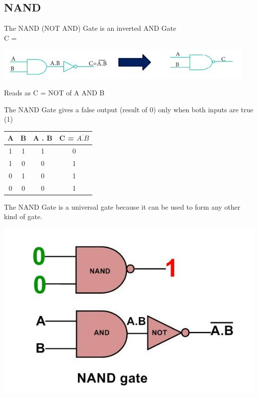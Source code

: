 \documentclass{article}
\begin{document}
\subsection{NAND}
The NAND (NOT AND) Gate is an inverted AND Gate \\
C = \begin{center}
	\includegraphics{16}
\end{center}
\color{red}Reads as C = NOT of A AND B \\ \color{black}

The NAND Gate gives a false output (result of 0) only when both inputs are true (1) \\

\begin{table}[h!]
	\begin{center}
		\begin{tabular}{c|c|c|c}
			\textbf{A} & \textbf{B} &
			\textbf{A . B} & \textbf{C = $\overline{A . B}$}\\
			\hline
			\cellcolor{blue!20}1 & \cellcolor{blue!20}1 & \cellcolor{blue!20}1 & \cellcolor{blue!20}0\\
			\hline
			\cellcolor{blue!30}1 & \cellcolor{blue!30}0 & \cellcolor{blue!30}0 & \cellcolor{blue!30}1\\
			\hline
			\cellcolor{blue!20}0 & \cellcolor{blue!20}1 & \cellcolor{blue!20}0 & \cellcolor{blue!20}1\\
			\hline
			\cellcolor{blue!30}0 & \cellcolor{blue!30}0 & \cellcolor{blue!30}0 & \cellcolor{blue!30}1\\
			\hline
		\end{tabular}
	\end{center}
\end{table} 

\color{red}The NAND Gate is a universal gate because it can be used to form any other kind of gate. \\ \color{black}
\begin{center}
	\includegraphics{18}
\end{center}
\end{document}
